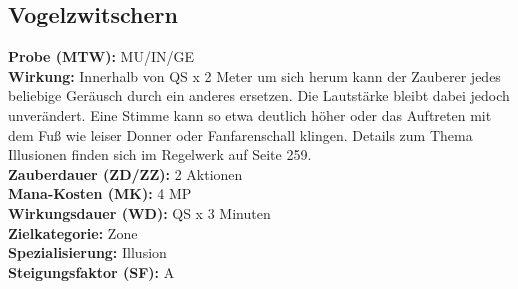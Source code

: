 \subsection{Vogelzwitschern}
\label{chap:vogelzwitschern}
\textbf{Probe (MTW):} MU/IN/GE \\
\textbf{Wirkung:} Innerhalb von QS x 2 Meter um sich herum kann der Zauberer jedes beliebige Geräusch durch ein anderes ersetzen. Die Lautstärke bleibt dabei jedoch unverändert. Eine Stimme kann so etwa deutlich höher oder das Auftreten mit dem Fuß wie leiser Donner oder Fanfarenschall klingen. Details zum Thema Illusionen finden sich im Regelwerk auf Seite 259.\\
\textbf{Zauberdauer (ZD/ZZ):} 2 Aktionen \\
\textbf{Mana-Kosten (MK):} 4 MP \\
\textbf{Wirkungsdauer (WD):} QS x 3 Minuten \\
\textbf{Zielkategorie:} Zone \\
\textbf{Spezialisierung:} Illusion \\
\textbf{Steigungsfaktor (SF):} A

